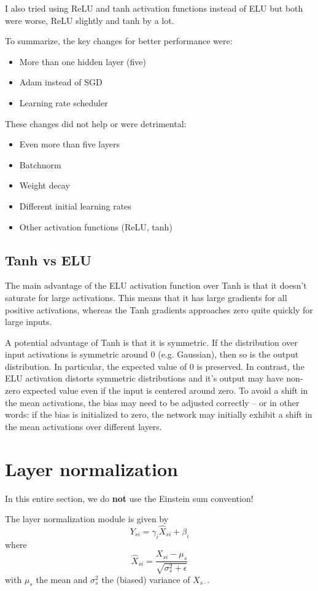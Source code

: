 \documentclass{article}
\begin{document}
I also tried using ReLU and tanh activation functions instead of ELU but both were worse, ReLU
slightly and tanh by a lot.

To summarize, the key changes for better performance were:
\begin{itemize}
\item More than one hidden layer (five)
\item Adam instead of SGD
\item Learning rate scheduler
\end{itemize}
These changes did not help or were detrimental:
\begin{itemize}
\item Even more than five layers
\item Batchnorm
\item Weight decay
\item Different initial learning rates
\item Other activation functions (ReLU, tanh)
\end{itemize}

\subsection{Tanh vs ELU}
The main advantage of the ELU activation function over Tanh is that it doesn't saturate for large
activations. This means that it has large gradients for all positive activations, whereas the Tanh
gradients approaches zero quite quickly for large inputs.

A potential advantage of Tanh is that it is symmetric. If the distribution over input activations
is symmetric around 0 (e.g. Gaussian), then so is the output distribution. In particular, the
expected value of 0 is preserved. In contrast, the ELU activation distorts symmetric distributions
and it's output may have non-zero expected value even if the input is centered around zero.
To avoid a shift in the mean activations, the bias may need to be adjusted correctly -- or in other
words: if the bias is initialized to zero, the network may initially exhibit a shift in the mean activations
over different layers.

\section{Layer normalization}
In this entire section, we do \textbf{not} use the Einstein sum convention!

The layer normalization module is given by
\[Y_{si} = \gamma_i \hat{X}_{si} + \beta_i\]
where
\[\hat{X}_{si} = \frac{X_{si} - \mu_s}{\sqrt{\sigma_s^2 + \epsilon}}\]
with \(\mu_s\) the mean and \(\sigma_s^2\) the (biased) variance of \(X_{s\cdot}\).
\end{document}

